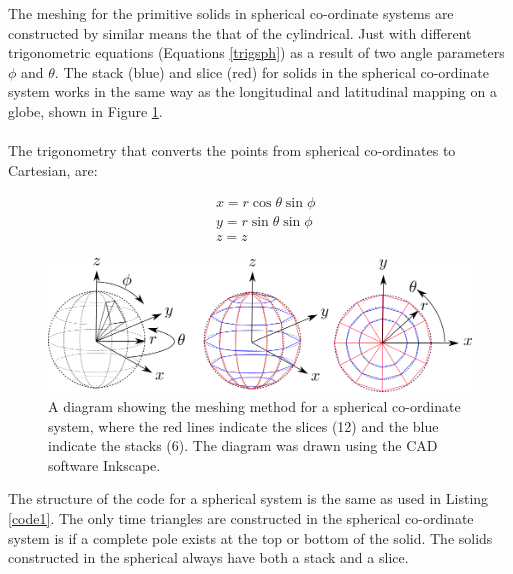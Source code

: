 \documentclass[12pt,a4paper]{article}
\begin{document}
The meshing for the primitive solids in spherical co-ordinate systems are constructed by similar means the that of the cylindrical. Just with different trigonometric equations (Equations \ref{trigsph}) as a result of two angle parameters $\phi$ and $\theta$. The stack (blue) and slice (red) for solids in the spherical co-ordinate system works in the same way as the longitudinal and latitudinal mapping on a globe, shown in Figure \ref{sphmeshin}. 
\\\\
The trigonometry that converts the points from spherical co-ordinates to Cartesian, are:

\begin{equation}
\begin{aligned}
& x = r \cos{\theta}\sin{\phi}\\
& y = r \sin{\theta}\sin{\phi} \\
& z = z
\end{aligned}
\label{trigsph}
\end{equation}
\begin{figure}[h!]
\centering
\includegraphics[scale=0.5]{Images//Coords//sph.png}
\caption[width=\columnwidth]{A diagram showing the meshing method for a spherical co-ordinate system, where the red lines indicate the slices (12) and the blue indicate the stacks (6). The diagram was drawn using the CAD software Inkscape.}
\label{sphmeshin}
\end{figure}

\noindent The structure of the code for a spherical system is the same as used in Listing \ref{code1}. The only time triangles are constructed in the spherical co-ordinate system is if a complete pole exists at the top or bottom of the solid. The solids constructed in the spherical always have both a stack and a slice.

%
\end{document}
